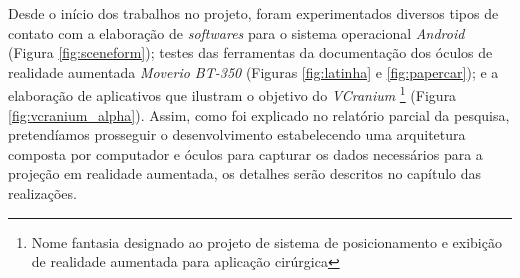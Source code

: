 Desde o início dos trabalhos no projeto, foram experimentados diversos tipos de contato com a elaboração de \textit{softwares} para o sistema operacional \textit{Android} (Figura \ref{fig:sceneform}); testes das ferramentas da documentação dos óculos de realidade aumentada \textit{Moverio BT-350} (Figuras \ref{fig:latinha} e \ref{fig:papercar}); e a elaboração de aplicativos que ilustram o objetivo do \textit{VCranium} \footnote[1]{Nome fantasia designado ao projeto de sistema de posicionamento e exibição de realidade aumentada para aplicação cirúrgica} (Figura \ref{fig:vcranium_alpha}). Assim, como foi explicado no relatório parcial da pesquisa, pretendíamos prosseguir o desenvolvimento estabelecendo uma arquitetura composta por computador e óculos para capturar os dados necessários para a projeção em realidade aumentada, os detalhes serão descritos no capítulo das realizações.

